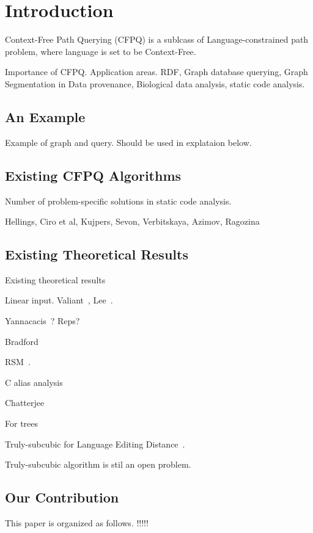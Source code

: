\section{Introduction}


Context-Free Path Querying (CFPQ) is a sublcass of Language-constrained path problem, where language is set to be Context-Free.

Importance of CFPQ. Application areas. RDF, Graph database querying, Graph Segmentation in Data provenance, Biological data analysis, static code analysis.

\subsection{An Example}

Example of graph and query. Should be used in explataion below.

\subsection{Existing CFPQ Algorithms}

Number of problem-specific solutions in static code analysis.

Hellings, Ciro et al, Kujpers, Sevon, Verbitskaya, Azimov, Ragozina 

\subsection{Existing Theoretical Results}

Existing theoretical results

Linear input. Valiant~\cite{Valiant:1975:GCR:1739932.1740048}, Lee~\cite{Lee:2002:FCG:505241.505242}.

Yannacacis~\cite{Yannakakis}? Reps?

Bradford~\cite{8249039}

RSM~\cite{10.1145/1328438.1328460}.

C alias analysis~\cite{10.1145/2714064.2660213}

Chatterjee~\cite{10.1145/3158118} 

For trees

Truly-subcubic for Language Editing Distance~\cite{doi:10.1137/17M112720X}.


Truly-subcubic algorithm is stil an open problem.

\subsection{Our Contribution}


This paper is organized as follows. !!!!!

